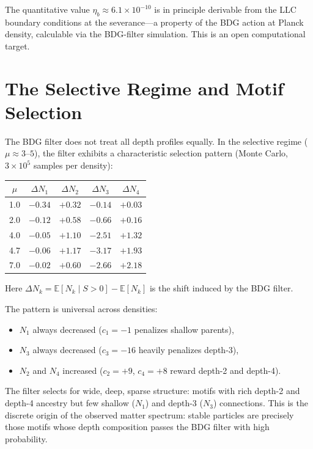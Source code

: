\documentclass[11pt]{article}
\begin{document}
The quantitative value $\eta_b\approx 6.1\times 10^{-10}$ is in principle derivable from the LLC boundary conditions at the severance---a property of the BDG action at Planck density, calculable via the BDG-filter simulation. This is an open computational target.

\section{The Selective Regime and Motif Selection}
\label{sec:selective}

The BDG filter does not treat all depth profiles equally. In the selective regime ($\mu\approx 3$--$5$), the filter exhibits a characteristic selection pattern (Monte Carlo, $3\times 10^5$ samples per density):

\begin{center}
\begin{tabular}{ccccc}
\toprule
$\mu$ & $\Delta N_1$ & $\Delta N_2$ & $\Delta N_3$ & $\Delta N_4$ \\
\midrule
1.0 & $-0.34$ & $+0.32$ & $-0.14$ & $+0.03$ \\
2.0 & $-0.12$ & $+0.58$ & $-0.66$ & $+0.16$ \\
4.0 & $-0.05$ & $+1.10$ & $-2.51$ & $+1.32$ \\
4.7 & $-0.06$ & $+1.17$ & $-3.17$ & $+1.93$ \\
7.0 & $-0.02$ & $+0.60$ & $-2.66$ & $+2.18$ \\
\bottomrule
\end{tabular}
\end{center}

Here $\Delta N_k=\mathbb{E}[N_k\mid S>0]-\mathbb{E}[N_k]$ is the shift induced by the BDG filter.

The pattern is universal across densities:
\begin{itemize}[nosep]
    \item $N_1$ always decreased ($c_1=-1$ penalizes shallow parents),
    \item $N_3$ always decreased ($c_3=-16$ heavily penalizes depth-3),
    \item $N_2$ and $N_4$ increased ($c_2=+9$, $c_4=+8$ reward depth-2 and depth-4).
\end{itemize}
The filter selects for wide, deep, sparse structure: motifs with rich depth-2 and depth-4 ancestry but few shallow ($N_1$) and depth-3 ($N_3$) connections. This is the discrete origin of the observed matter spectrum: stable particles are precisely those motifs whose depth composition passes the BDG filter with high probability.
\end{document}
